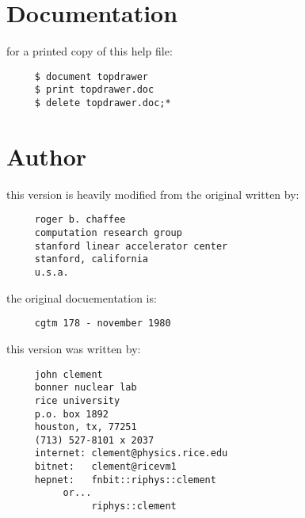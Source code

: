 \section{Documentation}
for a printed copy of this help file:  
\begin{verbatim}
     $ document topdrawer 
     $ print topdrawer.doc 
     $ delete topdrawer.doc;* 
\end{verbatim}
\section{Author}
this version is heavily modified from the original written by:  
\begin{verbatim}
     roger b. chaffee
     computation research group
     stanford linear accelerator center
     stanford, california
     u.s.a.
\end{verbatim}

the original docuementation is:
\begin{verbatim}
     cgtm 178 - november 1980
\end{verbatim}

this version was written by:
\begin{verbatim}
     john clement
     bonner nuclear lab
     rice university
     p.o. box 1892
     houston, tx, 77251
     (713) 527-8101 x 2037
     internet: clement@physics.rice.edu
     bitnet:   clement@ricevm1
     hepnet:   fnbit::riphys::clement
          or...
               riphys::clement
\end{verbatim}

